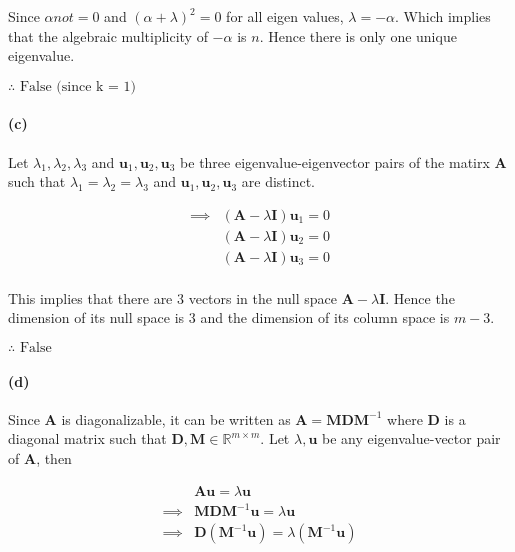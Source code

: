 \documentclass[12pt, letterpaper]{article}
\begin{document}
Since $\alpha not = 0$ and $(\alpha + \lambda)^2 = 0$ for all eigen values, $\lambda = -\alpha$. Which implies that the algebraic multiplicity of $-\alpha$ is $n$. Hence there is only one unique eigenvalue.

\vspace{1cm}
$\boxed{\therefore \text{ False (since k = 1)}}$

\paragraph{(c)} Let $\lambda_1, \lambda_2, \lambda_3$ and $\mathbf{u}_1,\mathbf{u}_2, \mathbf{u}_3$ be three eigenvalue-eigenvector pairs of the matirx $\mathbf{A}$ such that $\lambda_1 = \lambda_2 = \lambda_3$ and $\mathbf{u}_1, \mathbf{u}_2, \mathbf{u}_3$ are distinct.

\begin{align*}
  \implies &(\mathbf{A} - \lambda \mathbf{I})\mathbf{u}_1 = 0 \\
  &(\mathbf{A} - \lambda \mathbf{I})\mathbf{u}_2 = 0 \\
  &(\mathbf{A} - \lambda \mathbf{I})\mathbf{u}_3 = 0 \\
\end{align*}

This implies that there are $3$ vectors in the null space $\mathbf{A} - \lambda \mathbf{I}$. Hence the dimension of its null space is $3$ and the dimension of its column space is $m - 3$.

\vspace{1cm}
$\boxed{\therefore \text{ False }}$

\paragraph{(d)} Since $\mathbf{A}$ is diagonalizable, it can be written as $\mathbf{A} = \mathbf{M}\mathbf{D}\mathbf{M}^{-1}$ where $\mathbf{D}$ is a diagonal matrix such that $\mathbf{D}, \mathbf{M} \in \mathbb{R}^{m \times m}$. Let $\lambda, \mathbf{u}$ be any eigenvalue-vector pair of $\mathbf{A}$, then

\begin{align*}
  &\mathbf{Au} = \lambda\mathbf{u} \\
  \implies &\mathbf{MDM}^{-1}\mathbf{u} = \lambda\mathbf{u} \\
  \implies &\mathbf{D}(\mathbf{M}^{-1}\mathbf{u}) = \lambda (\mathbf{M}^{-1}\mathbf{u}) \\
\end{align*}
\end{document}
